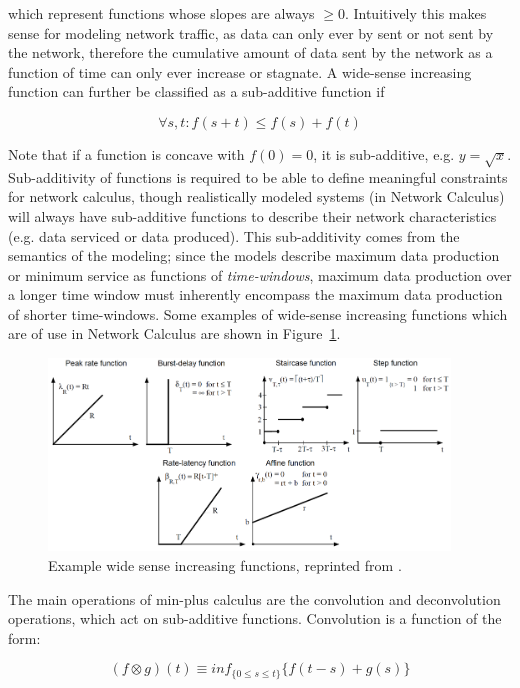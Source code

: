 which represent functions whose slopes are always $\geq 0$.
Intuitively this makes sense for modeling network traffic, as data can
only ever by sent or not sent by the network, therefore the cumulative
amount of data sent by the network as a function of time can only ever
increase or stagnate.  A wide-sense increasing function can further be
classified as a sub-additive function if

\begin{equation}
  \forall s,t : f(s+t) \leq f(s) + f(t)
\end{equation}

Note that if a function is concave with $f(0)=0$, it is sub-additive,
e.g. $y=\sqrt{x}$.  Sub-additivity of functions is required to be able
to define meaningful constraints for network calculus, though
realistically modeled systems (in Network Calculus) will always have
sub-additive functions to describe their network characteristics
(e.g. data serviced or data produced).  This sub-additivity comes from
the semantics of the modeling; since the models describe maximum data
production or minimum service as functions of \emph{time-windows},
maximum data production over a longer time window must inherently
encompass the maximum data production of shorter time-windows.  Some
examples of wide-sense increasing functions which are of use in
Network Calculus are shown in Figure~\ref{fig:wsi}.

\begin{figure}[htb]
  \centering
  \includegraphics[width=0.95\textwidth]{figs/wsi.png}
  \caption{Example wide sense increasing functions, reprinted from \cite{NCBook}.}
  \label{fig:wsi}
\end{figure}

The main operations of min-plus calculus are the convolution and
deconvolution operations, which act on sub-additive functions.
Convolution is a function of the form:

\begin{equation}
  (f\otimes g)(t)\equiv inf_{\{0\leq s \leq t\}}\{f(t-s)+g(s)\}
\end{equation}

